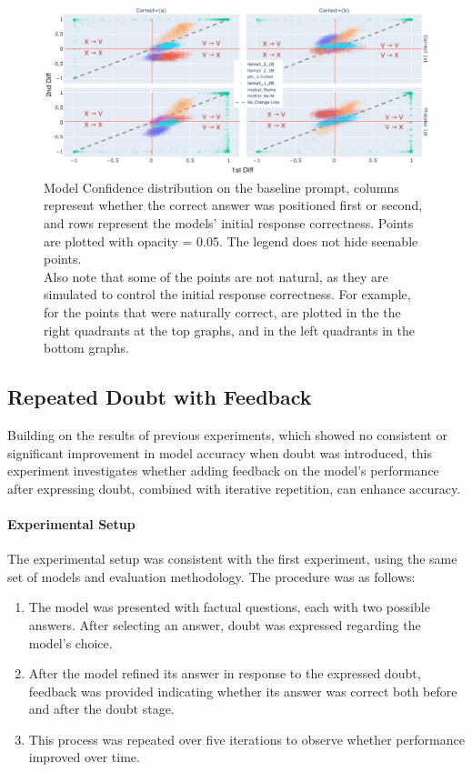 \begin{figure}[ht!]
  \includegraphics[width=\textwidth]{img/first_vs_last_logit_diff_on_baseline.png}
  \caption{Model Confidence distribution on the baseline prompt, columns represent whether the correct answer was positioned first or second, and rows represent the models' initial response correctness. Points are plotted with opacity = 0.05. The legend does not hide seenable points. \\
  Also note that some of the points are not natural, as they are simulated to control the initial response correctness. For example, for the points that were naturally correct, are plotted in the the right quadrants at the top graphs, and in the left quadrants in the bottom graphs.}
  \label{fig:models_confidence}
\end{figure}

\subsection{Repeated Doubt with Feedback}

Building on the results of previous experiments, which showed no consistent or significant improvement in model accuracy when doubt was introduced, this experiment investigates whether adding feedback on the model's performance after expressing doubt, combined with iterative repetition, can enhance accuracy.

\paragraph{Experimental Setup}
The experimental setup was consistent with the first experiment, using the same set of models and evaluation methodology. The procedure was as follows:

\begin{enumerate}
  \item The model was presented with factual questions, each with two possible answers. After selecting an answer, doubt was expressed regarding the model's choice.
  \item After the model refined its answer in response to the expressed doubt, feedback was provided indicating whether its answer was correct both before and after the doubt stage.
  \item This process was repeated over five iterations to observe whether performance improved over time.
\end{enumerate}


